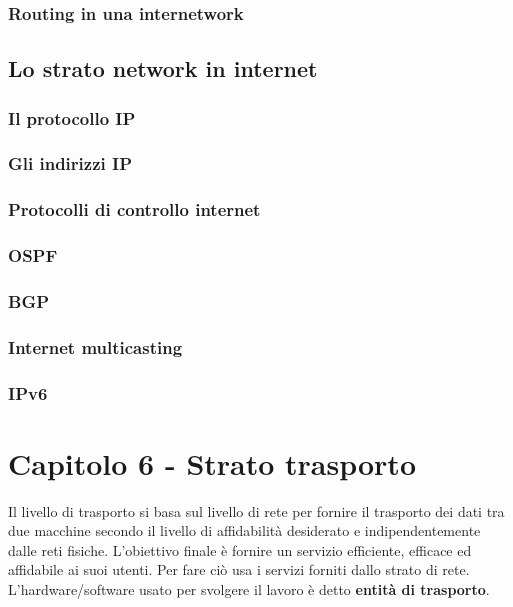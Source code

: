 \subsubsection{Routing in una internetwork}

\subsection{Lo strato network in internet}

\subsubsection{Il protocollo IP}

\subsubsection{Gli indirizzi IP}

\subsubsection{Protocolli di controllo internet}


\subsubsection{OSPF}

\subsubsection{BGP}

\subsubsection{Internet multicasting}

\subsubsection{IPv6}

\newpage
\section{Capitolo 6 - Strato trasporto}
Il livello di trasporto si basa sul livello di rete per fornire il trasporto dei dati tra due macchine secondo il livello di affidabilità desiderato e indipendentemente dalle reti fisiche. 
L'obiettivo finale è fornire un servizio efficiente, efficace ed affidabile ai suoi utenti.
Per fare ciò usa i servizi forniti dallo strato di rete. L'hardware/software usato per svolgere il lavoro è detto \textbf{entità di trasporto}.

